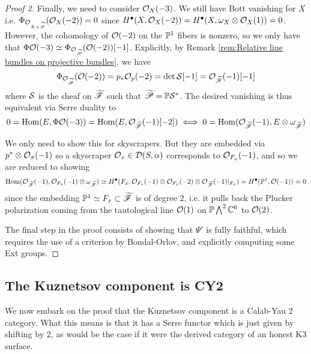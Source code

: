 \begin{proof}[Proof 2]
Finally, we need to consider $\O_X(-3)$. We still have Bott vanishing for $X$ i.e. $\Phi_{\O_{X\times \tscrF}}(\O_X(-2))=0$ since $H^\bullet(X, \O_X(-2))=H^\bullet(X, \omega_X \otimes \O_X(1))=0$. However, the cohomology of $\O(-2)$ on the $\P^1$ fibers is nonzero, so we only have that $\Phi \O(-3)\simeq \Phi_{\O_{\tscrP}}(\O(-2))[-1]$. Explicitly, by Remark \ref{rem:Relative line bundles on projective bundles}, we have 
$$\Phi_{\O_{\tscrP}}(\O(-2))=p_* \O_p(-2)= \det \calS[-1]=\O_{\tscrF} (-1)[-1]$$
where $\calS$ is the sheaf on $\tscrF$ such that $\tscrP = \P \calS^*$. The desired vanishing is thus equivalent via Serre duality to $$0 = \Hom(E, \Phi \O(-3))=\Hom(E, \O_{\tscrF} (-1)[-2])\iff 0=\Hom(\O_{\tscrF} (-1), E\otimes \omega_{\tscrF})$$

We only need to show this for skyscrapers. But they are embedded via $p^* \otimes \O_\pi(-1)$ so a skyscraper $\O_x \in \calD(S,\alpha)$ corresponds to $\O_{F_x}(-1)$, and so we are reduced to showing $$\Hom(\O_{\tscrF}(-1), \O_{F_x}(-1)\otimes\omega_{\tscrF})\simeq H^\bullet(F_x, \O_{F_x}(-1) \otimes \O_{F_x}(-2)\otimes \O_{\tscrF}(-1)|_{F_x})=H^\bullet(\P^1, \O(-1))=0$$since the embedding $\P^1 \simeq F_x \subset \tscrF$ is of degree $2$, i.e. it pulls back the Plucker polarization coming from the tautological line $\O(1)$ on $\P \bigwedge^2 \mathbb{C}^6$ to $\O(2)$.

The final step in the proof consists of showing that $\Psi'$ is fully faithful, which requires the use of a criterion by Bondal-Orlov, and explicitly computing some Ext groups. 

\end{proof}

\subsection{The Kuznetsov component is CY2}
We now embark on the proof that the Kuznetsov component is a Calab-Yau 2 category. What this means is that it has a Serre functor which is just given by shifting by $2$, as would be the case if it were the derived category of an honest K3 surface.

    


